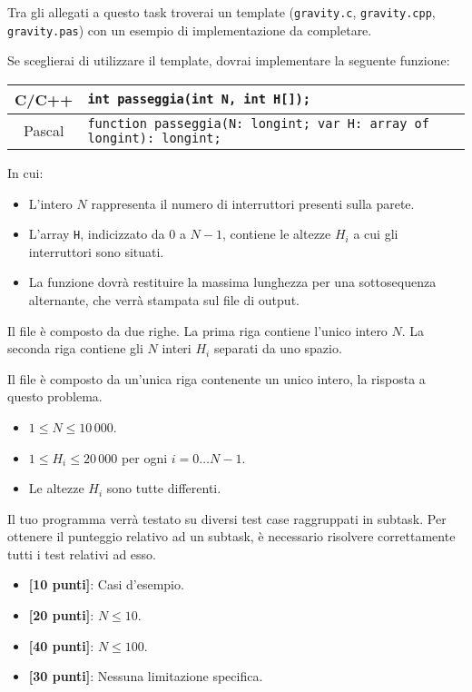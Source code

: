 \begin{warning}
Tra gli allegati a questo task troverai un template (\texttt{gravity.c}, \texttt{gravity.cpp}, \texttt{gravity.pas}) con un esempio di implementazione da completare.
\end{warning}

Se sceglierai di utilizzare il template, dovrai implementare la seguente funzione:
\begin{center}\begin{tabularx}{\textwidth}{|c|X|}
\hline
C/C++  & \verb|int passeggia(int N, int H[]);|\\
\hline
Pascal & \verb|function passeggia(N: longint; var H: array of longint): longint;|\\
\hline
\end{tabularx}\end{center}
In cui:
\begin{itemize}[nolistsep]
  \item L'intero $N$ rappresenta il numero di interruttori presenti sulla parete.
  \item L'array \texttt{H}, indicizzato da $0$ a $N-1$, contiene le altezze $H_i$ a cui gli interruttori sono situati.
  \item La funzione dovrà restituire la massima lunghezza per una sottosequenza alternante, che verrà stampata sul file di output.
\end{itemize}

\InputFile
Il file  è composto da due righe. La prima riga contiene l'unico intero $N$. La seconda riga contiene gli $N$ interi $H_i$ separati da uno spazio.

\OutputFile
Il file \outputfile{} è composto da un'unica riga contenente un unico intero, la risposta a questo problema.

\Constraints
\begin{itemize}[nolistsep, itemsep=2mm]
	\item $1 \le N \le 10\,000$.
	\item $1 \le H_i \le 20\,000$ per ogni $i=0\ldots N-1$.
	\item Le altezze $H_i$ sono tutte differenti.
\end{itemize}

\Scoring
Il tuo programma verrà testato su diversi test case raggruppati in subtask.
Per ottenere il punteggio relativo ad un subtask, è necessario risolvere
correttamente tutti i test relativi ad esso.

\begin{itemize}[nolistsep,itemsep=2mm]
  \item \textbf{ [10 punti]}: Casi d'esempio.
  \item \textbf{ [20 punti]}: $N \leq 10$.
  \item \textbf{ [40 punti]}: $N \leq 100$.
  \item \textbf{ [30 punti]}: Nessuna limitazione specifica.
\end{itemize}

